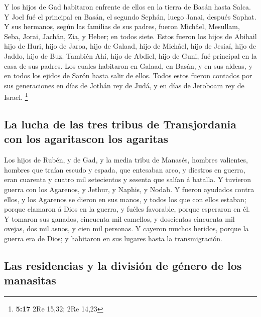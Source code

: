  Y los hijos de Gad habitaron enfrente de ellos en la
tierra de Basán hasta Salca.  Y Joel fué el principal en
Basán, el segundo Sephán, luego Janai, después Saphat.  Y
sus hermanos, según las familias de sus padres, fueron Michâel,
Mesullam, Seba, Jorai, Jachân, Zia, y Heber; en todos siete.
 Estos fueron los hijos de Abihail hijo de Huri, hijo de
Jaroa, hijo de Galaad, hijo de Michâel, hijo de Jesiaí, hijo de Jaddo,
hijo de Buz.  También Ahí, hijo de Abdiel, hijo de Guni,
fué principal en la casa de sus padres.  Los cuales
habitaron en Galaad, en Basán, y en sus aldeas, y en todos los ejidos de
Sarón hasta salir de ellos.  Todos estos fueron contados
por sus generaciones en días de Jothán rey de Judá, y en días de
Jeroboam rey de Israel. \footnote{\textbf{5:17} 2Re 15,32; 2Re 14,23}

\hypertarget{la-lucha-de-las-tres-tribus-de-transjordania-con-los-agaritascon-los-agaritas}{%
\subsection{La lucha de las tres tribus de Transjordania con los
agaritascon los
agaritas}\label{la-lucha-de-las-tres-tribus-de-transjordania-con-los-agaritascon-los-agaritas}}

 Los hijos de Rubén, y de Gad, y la media tribu de Manasés,
hombres valientes, hombres que traían escudo y espada, que entesaban
arco, y diestros en guerra, eran cuarenta y cuatro mil setecientos y
sesenta que salían á batalla.  Y tuvieron guerra con los
Agarenos, y Jethur, y Naphis, y Nodab.  Y fueron ayudados
contra ellos, y los Agarenos se dieron en sus manos, y todos los que con
ellos estaban; porque clamaron á Dios en la guerra, y fuéles favorable,
porque esperaron en él.  Y tomaron sus ganados, cincuenta
mil camellos, y doscientas cincuenta mil ovejas, dos mil asnos, y cien
mil personas.  Y cayeron muchos heridos, porque la guerra
era de Dios; y habitaron en sus lugares hasta la transmigración.

\hypertarget{las-residencias-y-la-divisiuxf3n-de-guxe9nero-de-los-manasitas}{%
\subsection{Las residencias y la división de género de los
manasitas}\label{las-residencias-y-la-divisiuxf3n-de-guxe9nero-de-los-manasitas}}

